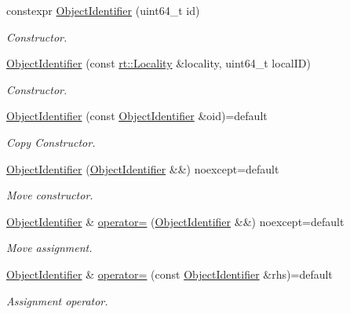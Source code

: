 \begin{DoxyCompactItemize}
\item 
constexpr \hyperlink{classshad_1_1ObjectIdentifier_ab6f49b8909c656bd4b39200835d0e193}{Object\-Identifier} (uint64\-\_\-t id)
\begin{DoxyCompactList}\small\item\em Constructor. \end{DoxyCompactList}\item 
\hyperlink{classshad_1_1ObjectIdentifier_a96ad35417513964b5fa77eefc32f1b38}{Object\-Identifier} (const \hyperlink{classshad_1_1rt_1_1Locality}{rt\-::\-Locality} \&locality, uint64\-\_\-t local\-I\-D)
\begin{DoxyCompactList}\small\item\em Constructor. \end{DoxyCompactList}\item 
\hyperlink{classshad_1_1ObjectIdentifier_a86c6936a35d1ffee1b46799ab9da3ce6}{Object\-Identifier} (const \hyperlink{classshad_1_1ObjectIdentifier}{Object\-Identifier} \&oid)=default
\begin{DoxyCompactList}\small\item\em Copy Constructor. \end{DoxyCompactList}\item 
\hyperlink{classshad_1_1ObjectIdentifier_a35133e64a83bb7bc409b1a5463149884}{Object\-Identifier} (\hyperlink{classshad_1_1ObjectIdentifier}{Object\-Identifier} \&\&) noexcept=default
\begin{DoxyCompactList}\small\item\em Move constructor. \end{DoxyCompactList}\item 
\hyperlink{classshad_1_1ObjectIdentifier}{Object\-Identifier} \& \hyperlink{classshad_1_1ObjectIdentifier_ad92baa9aba59cb9eb1195944fa3b1942}{operator=} (\hyperlink{classshad_1_1ObjectIdentifier}{Object\-Identifier} \&\&) noexcept=default
\begin{DoxyCompactList}\small\item\em Move assignment. \end{DoxyCompactList}\item 
\hyperlink{classshad_1_1ObjectIdentifier}{Object\-Identifier} \& \hyperlink{classshad_1_1ObjectIdentifier_ac8c31064900f1296b4e8ad5236b8e59f}{operator=} (const \hyperlink{classshad_1_1ObjectIdentifier}{Object\-Identifier} \&rhs)=default
\begin{DoxyCompactList}\small\item\em Assignment operator. \end{DoxyCompactList}\item 

\end{DoxyCompactItemize}
